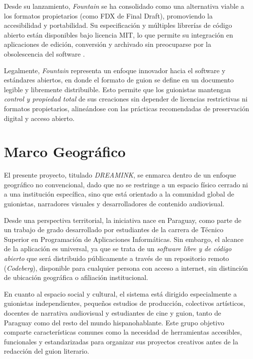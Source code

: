\documentclass[12pt]{article}
\begin{document}
	Desde su lanzamiento, \textit{Fountain} se ha consolidado como una alternativa viable a los formatos propietarios (como FDX de Final Draft), promoviendo la accesibilidad y portabilidad. Su especificación y múltiples librerías de código abierto están disponibles bajo licencia MIT, lo que permite su integración en aplicaciones de edición, conversión y archivado sin preocuparse por la obsolescencia del software \parencite{fountain_official, fountain_github}.

	Legalmente, \textit{Fountain} representa un enfoque innovador hacia el software y estándares abiertos, en donde el formato de guion se define en un documento legible y libremente distribuible. Esto permite que los guionistas mantengan \textit{control y propiedad total} de sus creaciones sin depender de licencias restrictivas ni formatos propietarios, alineándose con las prácticas recomendadas de preservación digital y acceso abierto.

	\section{Marco Geográfico}

	El presente proyecto, titulado \textit{DREAMINK}, se enmarca dentro de un enfoque geográfico no convencional, dado que no se restringe a un espacio físico cerrado ni a una institución específica, sino que está orientado a la comunidad global de guionistas, narradores visuales y desarrolladores de contenido audiovisual.

	Desde una perspectiva territorial, la iniciativa nace en Paraguay, como parte de un trabajo de grado desarrollado por estudiantes de la carrera de Técnico Superior en Programación de Aplicaciones Informáticas. Sin embargo, el alcance de la aplicación es universal, ya que se trata de un \textit{software libre y de código abierto} que será distribuido públicamente a través de un repositorio remoto (\textit{Codeberg}), disponible para cualquier persona con acceso a internet, sin distinción de ubicación geográfica o afiliación institucional.

	En cuanto al espacio social y cultural, el sistema está dirigido especialmente a guionistas independientes, pequeños estudios de producción, colectivos artísticos, docentes de narrativa audiovisual y estudiantes de cine y guion, tanto de Paraguay como del resto del mundo hispanohablante. Este grupo objetivo comparte características comunes como la necesidad de herramientas accesibles, funcionales y estandarizadas para organizar sus proyectos creativos antes de la redacción del guion literario.
\end{document}
